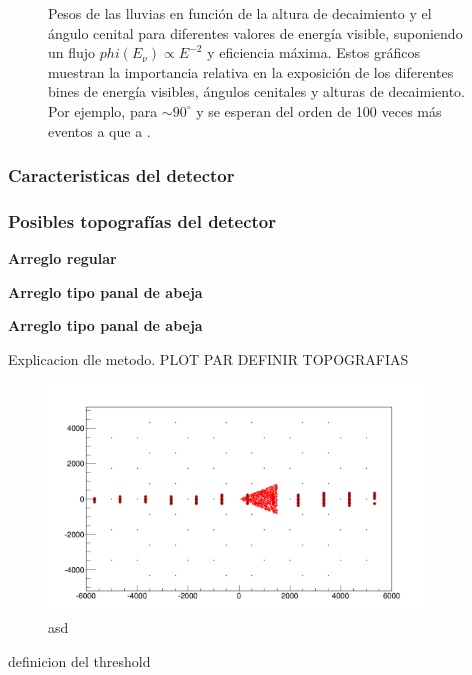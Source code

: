 \begin{figure}[ht!]
		\caption{\label{fig:radioShWeights}
		Pesos de las lluvias en funci\'on de la altura de decaimiento y el \'angulo cenital para diferentes valores de energ\'ia visible, suponiendo un flujo $phi(E_\nu)\propto E^{-2}$ y eficiencia m\'axima.
		Estos gr\'aficos muestran la importancia relativa en la exposici\'on de los diferentes bines de energ\'ia visibles, \'angulos cenitales y alturas de decaimiento.
		Por ejemplo, para $\sim90^\circ$ y  se esperan del orden de 100 veces m\'as eventos a  que a .
		}
	\end{figure}
	
	\subsubsection{Caracteristicas del detector}
	
	\subsubsection{Posibles topograf\'ias del detector}
	
	
	\textbf{Arreglo regular}
	
	\textbf{Arreglo tipo panal de abeja}
	
	\textbf{Arreglo tipo panal de abeja}
	
	Explicacion dle metodo.
	PLOT PAR DEFINIR TOPOGRAFIAS
	
	
	\begin{figure}[h!]
		\begin{center}
			\includegraphics[width=0.9\textwidth]{fig/resultadosRadio/17_00_89_90_00_00_00000_01238_60}
			\caption{asd}
			\label{fig:}
		\end{center}
	\end{figure}
	
	definicion del threshold
	
